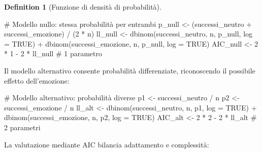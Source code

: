 \documentclass[
  letterpaper,
  DIV=11,
  numbers=noendperiod,
  oneside]{scrreprt}
\newenvironment{Shaded}{\begin{snugshade}}{\end{snugshade}}
\newcommand{\AttributeTok}[1]{\textcolor[rgb]{0.40,0.45,0.13}{#1}}
\newcommand{\CommentTok}[1]{\textcolor[rgb]{0.37,0.37,0.37}{#1}}
\newcommand{\ConstantTok}[1]{\textcolor[rgb]{0.56,0.35,0.01}{#1}}
\newcommand{\DecValTok}[1]{\textcolor[rgb]{0.68,0.00,0.00}{#1}}
\newcommand{\FunctionTok}[1]{\textcolor[rgb]{0.28,0.35,0.67}{#1}}
\newcommand{\NormalTok}[1]{\textcolor[rgb]{0.00,0.23,0.31}{#1}}
\newcommand{\OtherTok}[1]{\textcolor[rgb]{0.00,0.23,0.31}{#1}}
\newcommand{\SpecialCharTok}[1]{\textcolor[rgb]{0.37,0.37,0.37}{#1}}
\theoremstyle{definition}
\theoremstyle{plain}
\theoremstyle{definition}
\newtheorem{definition}{Definition}[chapter]
\theoremstyle{remark}
\begin{document}
\begin{definition}[Funzione di densità di
probabilità]
\begin{Shaded}
\begin{Highlighting}[]
\CommentTok{\# Modello nullo: stessa probabilità per entrambi}
\NormalTok{p\_null }\OtherTok{\textless{}{-}}\NormalTok{ (successi\_neutro }\SpecialCharTok{+}\NormalTok{ successi\_emozione) }\SpecialCharTok{/}\NormalTok{ (}\DecValTok{2} \SpecialCharTok{*}\NormalTok{ n)}
\NormalTok{ll\_null }\OtherTok{\textless{}{-}} \FunctionTok{dbinom}\NormalTok{(successi\_neutro, n, p\_null, }\AttributeTok{log =} \ConstantTok{TRUE}\NormalTok{) }\SpecialCharTok{+}
           \FunctionTok{dbinom}\NormalTok{(successi\_emozione, n, p\_null, }\AttributeTok{log =} \ConstantTok{TRUE}\NormalTok{)}
\NormalTok{AIC\_null }\OtherTok{\textless{}{-}} \DecValTok{2} \SpecialCharTok{*} \DecValTok{1} \SpecialCharTok{{-}} \DecValTok{2} \SpecialCharTok{*}\NormalTok{ ll\_null  }\CommentTok{\# 1 parametro}
\end{Highlighting}
\end{Shaded}

Il modello alternativo consente probabilità differenziate, riconoscendo
il possibile effetto dell'emozione:

\begin{Shaded}
\begin{Highlighting}[]
\CommentTok{\# Modello alternativo: probabilità diverse}
\NormalTok{p1 }\OtherTok{\textless{}{-}}\NormalTok{ successi\_neutro }\SpecialCharTok{/}\NormalTok{ n}
\NormalTok{p2 }\OtherTok{\textless{}{-}}\NormalTok{ successi\_emozione }\SpecialCharTok{/}\NormalTok{ n}
\NormalTok{ll\_alt }\OtherTok{\textless{}{-}} \FunctionTok{dbinom}\NormalTok{(successi\_neutro, n, p1, }\AttributeTok{log =} \ConstantTok{TRUE}\NormalTok{) }\SpecialCharTok{+}
          \FunctionTok{dbinom}\NormalTok{(successi\_emozione, n, p2, }\AttributeTok{log =} \ConstantTok{TRUE}\NormalTok{)}
\NormalTok{AIC\_alt }\OtherTok{\textless{}{-}} \DecValTok{2} \SpecialCharTok{*} \DecValTok{2} \SpecialCharTok{{-}} \DecValTok{2} \SpecialCharTok{*}\NormalTok{ ll\_alt  }\CommentTok{\# 2 parametri}
\end{Highlighting}
\end{Shaded}

La valutazione mediante AIC bilancia adattamento e complessità:


\end{definition}
\end{document}

